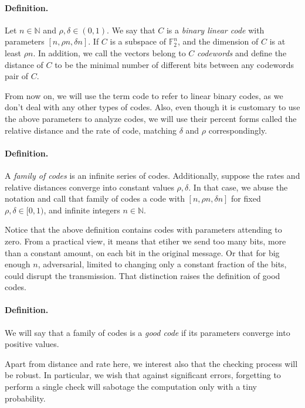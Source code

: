 \documentclass{article}
\begin{document}
\begin{multicols*}{2}
\paragraph{Definition.} Let $n \in \mathbb{N}$ and $\rho, \delta\in \left( 0,1 \right)$. We say that $C$ is a \textit{binary linear code} with parameters $[n, \rho n, \delta n]$. If $C$ is a subspace of $\mathbb{F}_{2}^{n}$, and the dimension of $C$ is at least $\rho n$. In addition, we call the vectors belong to $C$ \textit{codewords} and define the distance of $C$ to be the minimal number of different bits between any codewords pair of $C$.   

From now on, we will use the term code to refer to linear binary codes, as we don't deal with any other types of codes. Also, even though it is customary to use the above parameters to analyze codes, we will use their percent forms called the relative distance and the rate of code, matching $\delta$ and $\rho$ correspondingly.     
\paragraph{Definition.} A \textit{family of codes} is an infinite series of codes. Additionally, suppose the rates and relative distances converge into constant values $\rho,\delta$. In that case, we abuse the notation and call that family of codes a code with $[n, \rho n, \delta n]$ for fixed $\rho, \delta\in [ 0,1 )$, and infinite integers $n \in \mathbb{N}$.     

Notice that the above definition contains codes with parameters attending to zero. From a practical view, it means that etiher we send too many bits, more than a constant amount, on each bit in the original message. Or that for big enough $n$, adversarial, limited to changing only a constant fraction of the bits, could disrupt the transmission. That distinction raises the definition of good codes.

\paragraph{Definition.}We will say that a family of codes is a \textit{good code} if its parameters converge into positive values. 

Apart from distance and rate here, we interest also that the checking process will be robust. In particular,  we wish that against significant errors, forgetting to perform a single check will sabotage the computation only with a tiny probability.  

\end{multicols*}
\end{document}
